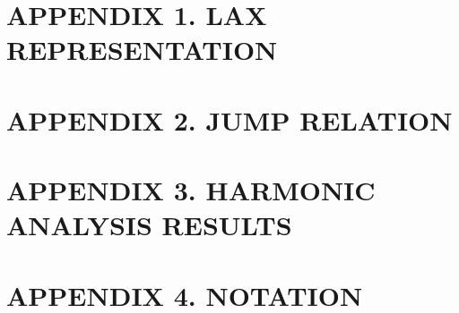 \documentclass[../dissertation.tex]{subfiles}
\begin{document}
\section{APPENDIX 1. LAX REPRESENTATION}\label{app:Lax}

\newpage


% 




\section{APPENDIX 2. JUMP RELATION}\label{app:JumpRelation}

\newpage


\section{APPENDIX 3. HARMONIC ANALYSIS RESULTS}\label{app:HA}

\newpage

\section{APPENDIX 4. NOTATION}\label{app:Notation}

\end{document}
